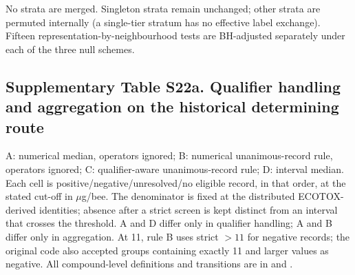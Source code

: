 No strata are merged. Singleton strata remain unchanged; other strata are permuted internally (a single-tier stratum has no effective label exchange). Fifteen representation-by-neighbourhood tests are BH-adjusted separately under each of the three null schemes.

\subsection*{Supplementary Table S22a. Qualifier handling and aggregation on the historical determining route}

A: numerical median, operators ignored; B: numerical unanimous-record rule, operators ignored; C: qualifier-aware unanimous-record rule; D: interval median. Each cell is positive/negative/unresolved/no eligible record, in that order, at the stated cut-off in $\mu$g/bee. The denominator is fixed at the distributed ECOTOX-derived identities; absence after a strict screen is kept distinct from an interval that crosses the threshold. A and D differ only in qualifier handling; A and B differ only in aggregation. At 11, rule B uses strict $>11$ for negative records; the original code also accepted groups containing exactly 11 and larger values as negative. All compound-level definitions and transitions are in  and .

\begingroup\footnotesize\setlength{\tabcolsep}{4pt}

